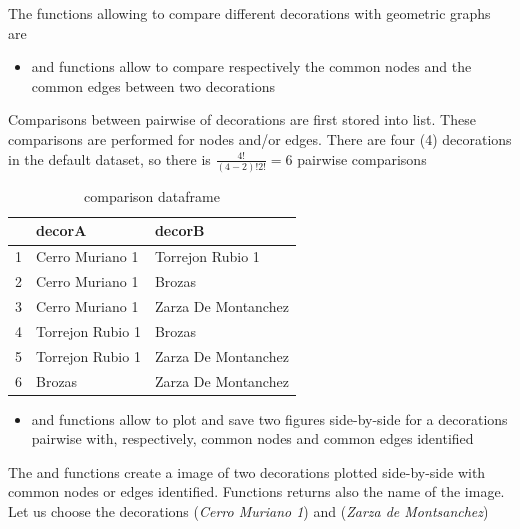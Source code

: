 \documentclass[article]{jss}
\begin{document}
The functions allowing to compare different decorations with geometric graphs are

\begin{itemize}
  \item {} and  functions allow to compare respectively the common nodes and the common edges between two decorations
\end{itemize}

Comparisons between pairwise of decorations are first stored into list. These comparisons are performed for nodes and/or edges. There are four (4) decorations in the default dataset, so there is $\frac{4!}{(4-2)!2!}={6}$ pairwise comparisons

\begin{table}[ht]
\centering
\begin{tabular}{rll}
  \hline
 & decorA & decorB \\ 
  \hline
1 & Cerro Muriano 1 & Torrejon Rubio 1 \\ 
  2 & Cerro Muriano 1 & Brozas \\ 
  3 & Cerro Muriano 1 & Zarza De Montanchez \\ 
  4 & Torrejon Rubio 1 & Brozas \\ 
  5 & Torrejon Rubio 1 & Zarza De Montanchez \\ 
  6 & Brozas & Zarza De Montanchez \\ 
   \hline
\end{tabular}
\caption{comparison dataframe} 
\label{Test_table_1}
\end{table}

\begin{itemize}  
  \item {} and  functions allow to plot and save two figures side-by-side for a decorations pairwise with, respectively, common nodes and common edges identified
\end{itemize}

The and  functions create a  image of two decorations plotted side-by-side with common nodes or edges identified. Functions returns also the name of the image. Let us choose the decorations  (\emph{Cerro Muriano 1}) and  (\emph{Zarza de Montsanchez})
\end{document}
